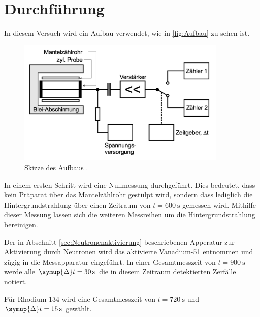 \section{Durchführung}
\label{sec:Durchführung}
In diesem Versuch wird ein Aufbau verwendet, wie in \autoref{fig:Aufbau} zu sehen ist.
\begin{figure}[H]
    \centering
    \includegraphics[height=6cm]{content/pics/Aufbau.png}
    \caption{Skizze des Aufbaus \cite{v702}.}
    \label{fig:Aufbau}
\end{figure}

In einem ersten Schritt wird eine Nullmessung durchgeführt. Dies bedeutet, dass kein Präparat über das Mantelzählrohr 
gestülpt wird, sondern dass lediglich die Hintergrundstrahlung über einen Zeitraum von $t=\qty{600}{\second}$ gemessen wird.
Mithilfe dieser Messung lassen sich die weiteren Messreihen um die Hintergrundstrahlung bereinigen.

Der in Abschnitt \ref{sec:Neutronenaktivierung} beschriebenen Apperatur zur Aktivierung durch Neutronen wird das aktivierte Vanadium-51
entnommen und zügig in die Messapparatur eingeführt. In einer Gesamtmesszeit von $t=\qty{900}{\second}$ werde alle $\symup{\Delta}t=\qty{30}{\second}$
die in diesem Zeitraum detektierten Zerfälle notiert.

Für Rhodium-134 wird eine Gesamtmesszeit von $t=\qty{720}{\second}$ und $\symup{\Delta}t=\qty{15}{\second}$ gewählt.